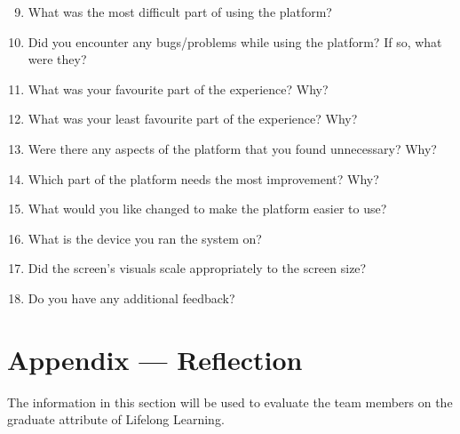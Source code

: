 \documentclass[12pt, titlepage]{article}
\begin{document}
\begin{enumerate}
    \setcounter{enumi}{8}
    \item What was the most difficult part of using the platform? \insertAnswerHere
    \item Did you encounter any bugs/problems while using the platform? If so, what were they? \insertAnswerHere
    \item What was your favourite part of the experience? Why? \insertAnswerHere
    \item What was your least favourite part of the experience? Why? \insertAnswerHere
    \item Were there any aspects of the platform that you found unnecessary? Why? \insertAnswerHere
    \item Which part of the platform needs the most improvement? Why? \insertAnswerHere
    \item What would you like changed to make the platform easier to use? \insertAnswerHere
    \item What is the device you ran the system on? \insertAnswerHere
    \item Did the screen's visuals scale appropriately to the screen size? \insertAnswerHere
    \item Do you have any additional feedback? \insertAnswerHere
\end{enumerate}

\newpage{}
\section*{Appendix --- Reflection}


The information in this section will be used to evaluate the team members on the
graduate attribute of Lifelong Learning.


\end{document}
